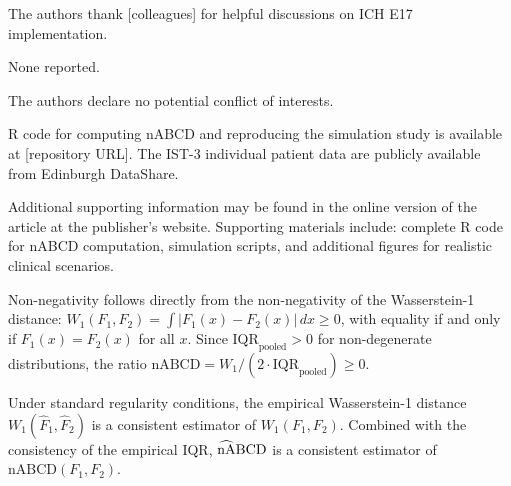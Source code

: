 \documentclass[AMA,Times1COL]{WileyNJDv5}
\newcommand{\hnABCD}{\mathrlap{\widehat{\phantom{\text{nA}}}}\text{nABCD}}
\begin{document}

The authors thank [colleagues] for helpful discussions on ICH E17 implementation.


None reported.


The authors declare no potential conflict of interests.


R code for computing nABCD and reproducing the simulation study is available at [repository URL]. The IST-3 individual patient data are publicly available from Edinburgh DataShare.\cite{ist3_2012}




Additional supporting information may be found in the online version of the article at the publisher's website. Supporting materials include: complete R code for nABCD computation, simulation scripts, and additional figures for realistic clinical scenarios.

\appendix



Non-negativity follows directly from the non-negativity of the Wasserstein-1 distance: $W_1(F_1, F_2) = \int |F_1(x) - F_2(x)| \, dx \geq 0$, with equality if and only if $F_1(x) = F_2(x)$ for all $x$. Since $\text{IQR}_{\text{pooled}} > 0$ for non-degenerate distributions, the ratio $\text{nABCD} = W_1 / (2 \cdot \text{IQR}_{\text{pooled}}) \geq 0$.


Under standard regularity conditions, the empirical Wasserstein-1 distance $W_1(\hat{F}_1, \hat{F}_2)$ is a consistent estimator of $W_1(F_1, F_2)$.\cite{delbarrio1999} Combined with the consistency of the empirical IQR, $\hnABCD$ is a consistent estimator of $\text{nABCD}(F_1, F_2)$.
\end{document}
